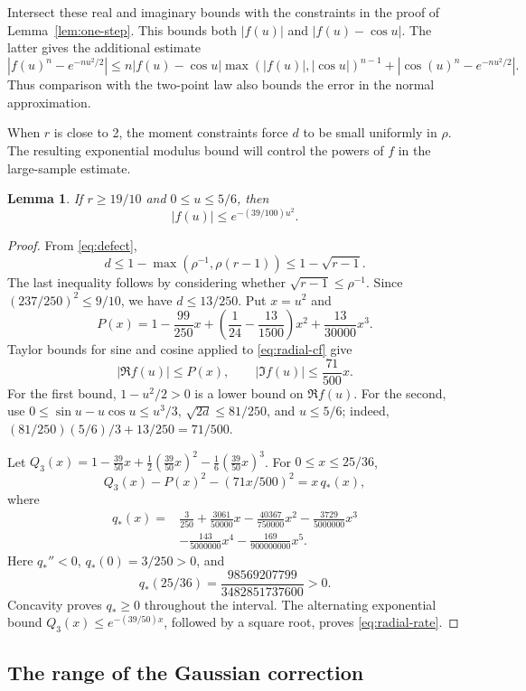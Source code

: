 \documentclass[11pt]{article}
\newtheorem{lemma}[theorem]{Lemma}
\begin{document}
Intersect these real and imaginary bounds with the constraints in the proof
of Lemma~\ref{lem:one-step}. This bounds both
\(|f(u)|\) and \(|f(u)-\cos u|\). The latter gives the additional estimate
\[
 |f(u)^n-e^{-nu^2/2}|
 \le n|f(u)-\cos u|\max(|f(u)|,|\cos u|)^{n-1}
      +|\cos(u)^n-e^{-nu^2/2}|.
 \label{eq:rademacher}\tag{3.6}
\]
Thus comparison with the two-point law also bounds the error in the
normal approximation.

When \(r\) is close to 2, the moment constraints force \(d\) to be
small uniformly in \(\rho\). The resulting exponential modulus bound
will control the powers of \(f\) in the large-sample estimate.

\begin{lemma}\label{lem:radial-rate}
If \(r\ge19/10\) and \(0\le u\le5/6\), then
\[
 |f(u)|\le e^{-(39/100)u^2}.
 \label{eq:radial-rate}\tag{3.7}
\]
\end{lemma}

\begin{proof}
From \eqref{eq:defect},
\[
 d\le1-\max(\rho^{-1},\rho(r-1))\le1-\sqrt{r-1}.
\]
The last inequality follows by considering whether
\(\sqrt{r-1}\le\rho^{-1}\). Since
\((237/250)^2\le9/10\), we have \(d\le13/250\).
Put \(x=u^2\) and
\[
 P(x)=1-\frac{99}{250}x+
       \left(\frac1{24}-\frac{13}{1500}\right)x^2+
       \frac{13}{30000}x^3.
\]
Taylor bounds for sine and cosine applied to \eqref{eq:radial-cf} give
\[
 |\Re f(u)|\le P(x),\qquad
 |\Im f(u)|\le\frac{71}{500}x.
\]
For the first bound, \(1-u^2/2>0\) is a lower bound on \(\Re f(u)\).
For the second, use
\(0\le\sin u-u\cos u\le u^3/3\),
\(\sqrt{2d}\le81/250\), and \(u\le5/6\); indeed,
\((81/250)(5/6)/3+13/250=71/500\).

Let \(Q_3(x)=1-\frac{39}{50}x+
\frac12(\frac{39}{50}x)^2-\frac16(\frac{39}{50}x)^3\).
For \(0\le x\le25/36\),
\[
 Q_3(x)-P(x)^2-(71x/500)^2=x\,q_*(x),
\]
where
\[
\begin{aligned}
q_*(x)={}&\frac3{250}+\frac{3061}{50000}x
 -\frac{40367}{750000}x^2-\frac{3729}{5000000}x^3\\
 &-\frac{143}{5000000}x^4-\frac{169}{900000000}x^5.
\end{aligned}
\]
Here \(q_*''<0\), \(q_*(0)=3/250>0\), and
\[
 q_*(25/36)=\frac{98569207799}{3482851737600}>0.
\]
Concavity proves \(q_*\ge0\) throughout the interval. The alternating
exponential bound \(Q_3(x)\le e^{-(39/50)x}\), followed by a square root,
proves \eqref{eq:radial-rate}.
\end{proof}

\subsection{The range of the Gaussian correction}\label{sec:feasible-disk}
\end{document}
